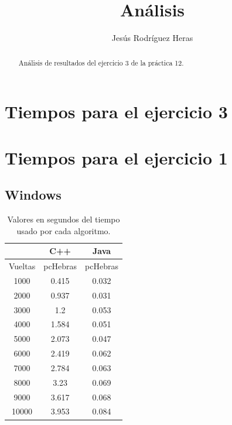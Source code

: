 \documentclass[12pt,letterpaper]{article}
\title{Análisis}
\author{Jesús Rodríguez Heras}
\begin{document}
	
	\maketitle
	\begin{abstract} %
		\begin{center}
			Análisis de resultados del ejercicio 3 de la práctica 12.
		\end{center}
	\end{abstract}
	\thispagestyle{empty}
	\newpage
	
	
	
	
	
	\lstset{language=bash, numbers=left, numberstyle=\tiny, numbersep=10pt, firstnumber=1, stepnumber=1, basicstyle=\small\ttfamily, tabsize=1, extendedchars=true, inputencoding=latin1}

\section{Tiempos para el ejercicio 3}
\section{Tiempos para el ejercicio 1}
\subsection{Windows}
\begin{center}
	\begin{table}[htbp]
		\begin{center}
			\begin{tabular}{|c|c|c|}
				\hline
				& \multicolumn{1}{c|}{C++} & \multicolumn{1}{c|}{Java}  \\
				\hline
				Vueltas  & pcHebras & pcHebras \\\hline
				1000 & 0.415 & 0.032  \\\hline
				2000 & 0.937 & 0.031  \\\hline
				3000 & 1.2 & 0.053  \\\hline
				4000 & 1.584 & 0.051  \\\hline
				5000 & 2.073 & 0.047  \\\hline
				6000 & 2.419 & 0.062  \\\hline
				7000 & 2.784 & 0.063  \\\hline
				8000 & 3.23 & 0.069  \\\hline
				9000 & 3.617 & 0.068  \\\hline
				10000 & 3.953 & 0.084  \\\hline
			\end{tabular}
			\caption{Valores en segundos del tiempo usado por cada algoritmo.}
			\label{tabla:Valores en segundos del tiempo usado por cada algoritmo}
		\end{center}
	\end{table}
\end{center}
\end{document}
